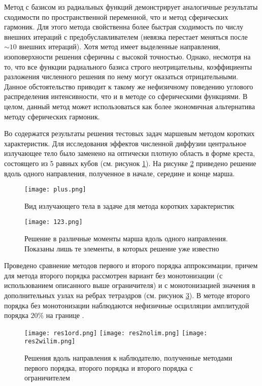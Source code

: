 Метод с базисом из радиальных функций демонстрирует аналогичные результаты сходимости по пространственной переменной, что и метод сферических гармоник. Для этого метода свойственна более быстрая сходимость по числу внешних итераций с предобуславливателем (невязка перестает меняться после $\sim 10$ внешних итераций). Хотя метод имеет выделенные направления, изоповерхности решения сферичны с высокой точностью. Однако, несмотря на то, что все функции радиального базиса строго неотрицательны, коэффициенты разложения численного решения по нему могут оказаться отрицательными. Данное обстоятельство приводит к такому же нефизичному поведению углового распределения интенсивности, что и в методе со сферическими функциями. В целом, данный метод может использоваться как более экономичная альтернатива методу сферических гармоник.

Во  содержатся результаты решения тестовых задач маршевым методом коротких характеристик. Для исследования эффектов численной диффузии центральное излучающее тело было заменено на оптически плотную область в форме креста, состоящего из 5 равных кубов (см. рисунок \ref{fig:plus}).
На рисунке \ref{fig:march} приведено решение вдоль одного направления, полученное в начале, середине и конце марша.
\begin{figure}[ht!]
\centering
\texttt{[image: plus.png]}
\caption{Вид излучающего тела в задаче для метода коротких характеристик}
\label{fig:plus}
\end{figure}
\begin{figure}[ht!]
\centering
\texttt{[image: 123.png]}
\caption{Решение в различные моменты марша вдоль одного направления. Показаны лишь те элементы, в которых решение уже известно}
\label{fig:march}
\end{figure}

Проведено сравнение методов первого и второго порядка аппроксимации, причем для метода второго порядка рассмотрен вариант без монотонизации (с использованием описанного выше ограничителя) и с монотонизацией значения в дополнительных узлах на ребрах тетраэдров (см. рисунок \ref{fig:ord}). В методе второго порядка без монотонизации наблюдаются нефизичные осцилляции амплитудой порядка $20\%$ на границе .
\begin{figure}[ht!]
\centering
\texttt{[image: res1ord.png]} %
\texttt{[image: res2nolim.png]} %
\texttt{[image: res2wilim.png]} %
\caption{Решения вдоль направления к наблюдателю, полученные методами первого порядка, второго порядка и второго порядка с ограничителем}
\label{fig:ord}
\end{figure}

